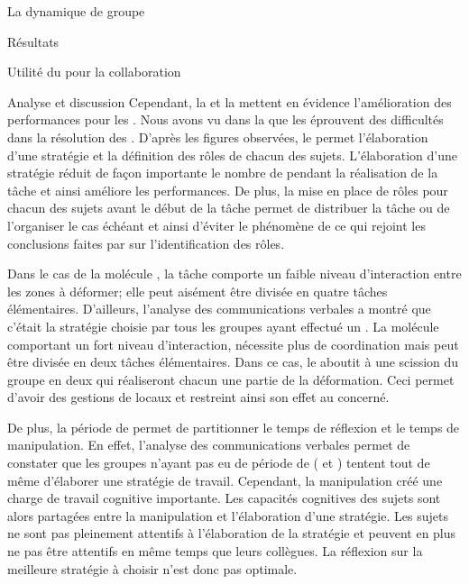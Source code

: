 \documentclass[myfrancais]{mythesis}
\begin{document}
\begin{mychapter}{La dynamique de groupe}
\begin{mysection}{Résultats}
\begin{mysubsection}{Utilité du \mybrainstorming pour la collaboration}
\begin{mysubsubsection}{Analyse et discussion}
					Cependant, la  et la  mettent en évidence l'amélioration des performances pour les .
					Nous avons vu dans la  que les  éprouvent des difficultés dans la résolution des .
					D'après les figures observées, le \mybrainstorming permet l'élaboration d'une stratégie et la définition des rôles de chacun des sujets.
					L'élaboration d'une stratégie réduit de façon importante le nombre de  pendant la réalisation de la tâche et ainsi améliore les performances.
					De plus, la mise en place de rôles pour chacun des sujets avant le début de la tâche permet de distribuer la tâche ou de l'organiser le cas échéant et ainsi d'éviter le phénomène de  ce qui rejoint les conclusions faites par  sur l'identification des rôles.

					Dans le cas de la molécule \myPrion, la tâche comporte un faible niveau d'interaction entre les zones à déformer; elle peut aisément être divisée en quatre tâches élémentaires.
					D'ailleurs, l'analyse des communications verbales a montré que c'était la stratégie choisie par tous les groupes ayant effectué un \mybrainstorming.
					La molécule \myUbiquitin comportant un fort niveau d'interaction, nécessite plus de coordination mais peut être divisée en deux tâches élémentaires.
					Dans ce cas, le \mybrainstorming aboutit à une scission du groupe en deux  qui réaliseront chacun une partie de la déformation.
					Ceci permet d'avoir des gestions de  locaux et restreint ainsi son effet au  concerné.

					De plus, la période de \mybrainstorming permet de partitionner le temps de réflexion et le temps de manipulation.
					En effet, l'analyse des communications verbales permet de constater que les groupes n'ayant pas eu de période de \mybrainstorming ( et ) tentent tout de même d'élaborer une stratégie de travail.
					Cependant, la manipulation créé une charge de travail cognitive importante.
					Les capacités cognitives des sujets sont alors partagées entre la manipulation et l'élaboration d'une stratégie.
					Les sujets ne sont pas pleinement attentifs à l'élaboration de la stratégie et peuvent en plus ne pas être attentifs en même temps que leurs collègues.
					La réflexion sur la meilleure stratégie à choisir n'est donc pas optimale.


\end{mysubsubsection}
\end{mysubsection}
\end{mysection}
\end{mychapter}
\end{document}
